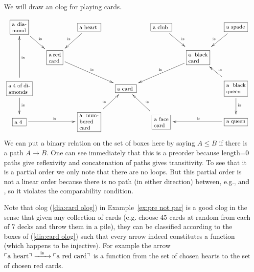 \documentclass[CT4S-EN-RU]{subfiles}
\begin{document}
\begin{exampleENG}\label{ex:pre not par}
We will draw an olog for playing cards. 
\begin{align}\label{dia:card olog}
\footnotesize
\xymatrixnocompile@=15pt{
\obox{}{.3in}{a diamond}\ar[dr]^{\tn{is}}&&\obox{}{.4in}{a heart}\ar[dl]_{\tn{is}}&&\obox{}{.35in}{a club}\ar[dr]^{\tn{is}}&&\obox{}{.4in}{a spade}\ar[dl]_{\tn{is}}\\
&\obox{}{.25in}{a red card}\ar[drr]^{\tn{is}}&&&&\obox{}{.4in}{a black card}\ar[dll]_{\tn{is}}\\
\obox{}{.45in}{a 4 of diamonds}\ar[d]^{\tn{is}}\ar[uu]_{\tn{is}}&&&\obox{}{.35in}{a card}&&&\obox{}{.4in}{a black queen}\ar[d]^{\tn{is}}\ar[ul]_{\tn{is}}\\
\obox{}{.2in}{a 4}\ar[rr]^{\tn{is}}&&\obox{}{.4in}{a numbered card}\ar[ur]^{\tn{is}}&&\obox{}{.3in}{a face card}\ar[ul]_{\tn{is}}&&\obox{}{.4in}{a queen}\ar[ll]_{\tn{is}}
}
\end{align}
We can put a binary relation on the set of boxes here by saying $A\leq B$ if there is a path $A\to B.$ One can see immediately that this is a preorder because length=0 paths give reflexivity and concatenation of paths gives transitivity. To see that it is a partial order we only note that there are no loops. But this partial order is not a linear order because there is no path (in either direction) between, e.g.,  and , so it violates the comparability condition.
\end{exampleENG}

\begin{exampleRUS}\label{ex:pre not par}
\end{exampleRUS}

\begin{remarkENG}
Note that olog (\ref{dia:card olog}) in Example~\ref{ex:pre not par} is a good olog in the sense that given any collection of cards (e.g. choose 45 cards at random from each of 7 decks and throw them in a pile), they can be classified according to the boxes of (\ref{dia:card olog}) such that every arrow indeed constitutes a function (which happens to be injective). For example the arrow $\textnormal{$\ulcorner$a heart$\urcorner$}\xrightarrow{\ \ \textnormal{is}\ \ }\textnormal{$\ulcorner$a red card$\urcorner$}$ is a function from the set of chosen hearts to the set of chosen red cards.
\end{remarkENG}

\begin{remarkRUS}
\end{remarkRUS}
\end{document}
